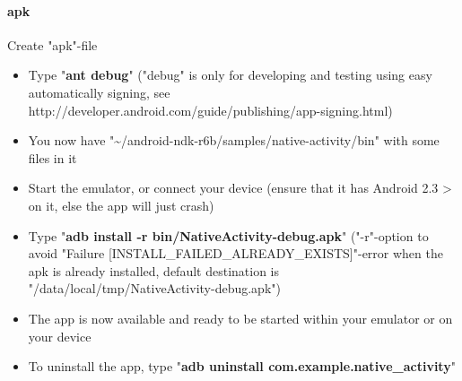 \paragraph{apk}
Create "apk"-file
\begin{itemize}
\item{Type "\textbf{ant debug}" ("debug" is only for developing and testing using easy automatically signing, see http://developer.android.com/guide/publishing/app-signing.html)}
\item{\textrightarrow  You now have "\textasciitilde /android-ndk-r6b/samples/native-activity/bin" with some files in it}
\item{Start the emulator, or connect your device (ensure that it has Android 2.3 > on it, else the app will just crash)}
\item{Type "\textbf{adb install -r bin/NativeActivity-debug.apk}" ("-r"-option to avoid "Failure [INSTALL\_FAILED\_ALREADY\_EXISTS]"-error when the apk is already installed, default destination is "/data/local/tmp/NativeActivity-debug.apk")}
\item{\textrightarrow  The app is now available and ready to be started within your emulator or on your device}
\item{\textrightarrow  To uninstall the app, type "\textbf{adb uninstall com.example.native\_activity}"}
\end{itemize}


